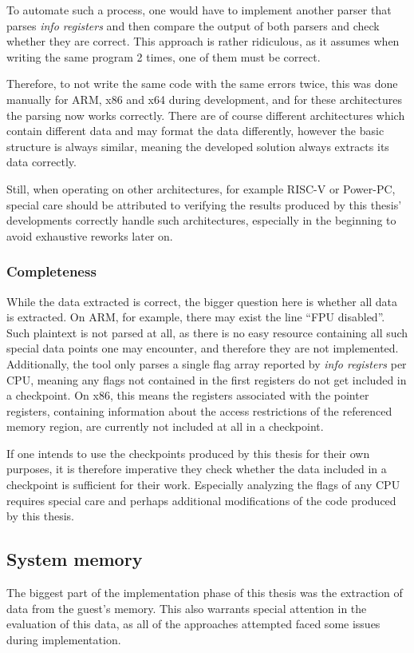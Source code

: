 To automate such a process, one would have to implement another parser that parses \emph{info registers}
and then compare the output of both parsers and check whether they are correct.
This approach is rather ridiculous, as it assumes when writing the same program 2 times,
one of them must be correct.

Therefore, to not write the same code with the same errors twice,
this was done manually for ARM, x86 and x64 during development,
and for these architectures the parsing now works correctly.
There are of course different architectures which contain different data
and may format the data differently, however the basic structure is always similar,
meaning the developed solution always extracts its data correctly.

Still, when operating on other architectures, for example RISC-V or Power-PC,
special care should be attributed to verifying
the results produced by this thesis' developments
correctly handle such architectures, especially in the beginning to avoid exhaustive reworks later on.

\subsubsection*{Completeness}
While the data extracted is correct, the bigger question here is whether all data is extracted.
On ARM, for example, there may exist the line \enquote{FPU disabled}.
Such plaintext is not parsed at all,
as there is no easy resource containing all such special data points one may encounter,
and therefore they are not implemented.
Additionally, the tool only parses a single flag array reported by \emph{info registers} per CPU,
meaning any flags not contained in the first registers do not get included in a checkpoint.
On x86, this means the registers associated with the pointer registers,
containing information about the access restrictions of the referenced memory region,
are currently not included at all in a checkpoint.

If one intends to use the checkpoints produced by this thesis for their own purposes,
it is therefore imperative they check whether the data included in a checkpoint is sufficient for their work.
Especially analyzing the flags of any CPU requires special care
and perhaps additional modifications of the code produced by this thesis.

\subsection{System memory}
The biggest part of the implementation phase of this thesis
was the extraction of data from the guest's memory.
This also warrants special attention in the evaluation of this data,
as all of the approaches attempted faced some issues during implementation.

